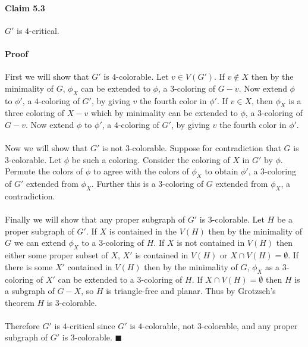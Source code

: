 \documentclass[letterpaper,12pt,oneside,onecolumn]{report}
\begin{document}
\paragraph{Claim 5.3}
$G'$ is $4$-critical.
\paragraph{Proof}
First we will show that $G'$ is $4$-colorable. Let $v \in V(G')$. If $v \not \in X$ then by the minimality of $G$, $\phi_X$  can be extended to $\phi$, a $3$-coloring of $G-v$. Now extend $\phi$ to $\phi'$, a $4$-coloring of $G'$, by giving $v$ the fourth color in $\phi'$. If $v \in X$, then $\phi_X$ is a three coloring of $X-v$ which by minimality can be extended to $\phi$, a $3$-coloring of $G-v$. Now extend $\phi$ to $\phi'$, a $4$-coloring of $G'$, by giving $v$ the fourth color in $\phi'$.
\paragraph{}
Now we will show that $G'$ is not $3$-colorable. Suppose for contradiction that $G$ is $3$-colorable. Let $\phi$ be such a coloring. Consider the coloring of $X$ in $G'$ by $\phi$. Permute the colors of $\phi$ to agree with the colors of $\phi_X$ to obtain $\phi'$, a $3$-coloring of $G'$ extended from $\phi_X$. Further this is a $3$-coloring of $G$ extended from $\phi_X$, a contradiction.
\paragraph{}
Finally we will show that any proper subgraph of $G'$ is $3$-colorable. Let $H$ be a proper subgraph of $G'$. If $X$ is contained in the $V(H)$ then by the minimality of $G$ we can extend $\phi_X$ to a $3$-coloring of $H$. If $X$ is not contained in $V(H)$ then either some proper subset of $X$, $X'$ is contained in $V(H)$ or $X \cap V(H) = \emptyset$. If there is some $X'$ contained in $V(H)$ then by the minimality of $G$, $\phi_X$ as a $3$-coloring of $X'$ can be extended to a $3$-coloring of $H$. If $X \cap V(H) = \emptyset$ then $H$ is a subgraph of $G - X$, so $H$ is triangle-free and planar. Thus by Grotzsch's theorem $H$ is $3$-colorable.
\paragraph{}
Therefore $G'$ is $4$-critical since $G'$ is $4$-colorable, not $3$-colorable, and any proper subgraph of $G'$ is $3$-colorable. $\blacksquare$
\end{document}
